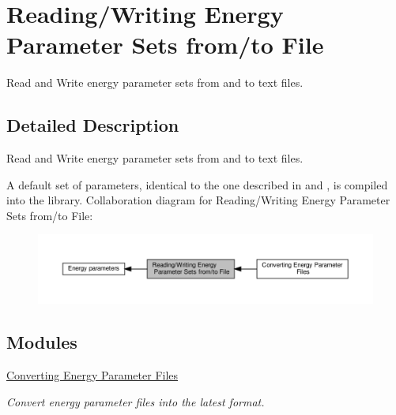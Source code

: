 \hypertarget{group__energy__parameters__rw}{}\section{Reading/\+Writing Energy Parameter Sets from/to File}
\label{group__energy__parameters__rw}


Read and Write energy parameter sets from and to text files.  




\subsection{Detailed Description}
Read and Write energy parameter sets from and to text files. 

A default set of parameters, identical to the one described in \cite{mathews:2004} and \cite{turner:2010}, is compiled into the library. Collaboration diagram for Reading/\+Writing Energy Parameter Sets from/to File\+:
\nopagebreak
\begin{figure}[H]
\begin{center}
\leavevmode
\includegraphics[width=350pt]{group__energy__parameters__rw}
\end{center}
\end{figure}
\subsection*{Modules}
\begin{DoxyCompactItemize}
\item 
\hyperlink{group__energy__parameters__convert}{Converting Energy Parameter Files}
\begin{DoxyCompactList}\small\item\em Convert energy parameter files into the latest format. \end{DoxyCompactList}\end{DoxyCompactItemize}
